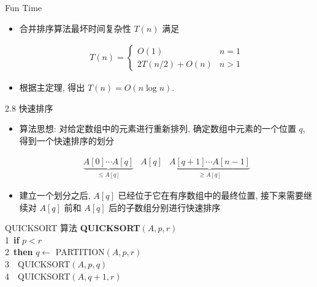 \documentclass[fontset=fandol,UTF8,fleqn]{beamer}
\begin{document}
\begin{frame}{Fun Time}
\begin{itemize}[<+-|alert@+>]
\item 合并排序算法最坏时间复杂性 $T(n)$ 满足 
  \begin{exampleblock}{}
    \begin{eqnarray*}
  T(n) = \left\{
    \begin{array}{ll}
      O(1) & n = 1   \\
2T(n/2)+O(n) & n > 1   
    \end{array}\right. 
\end{eqnarray*}
\end{exampleblock}
\item 根据主定理, 得出 $T(n)=O(n\log n)$.  
\end{itemize}
\end{frame}

\begin{frame}{2.8 快速排序}
\begin{itemize}[<+-|alert@+>]
\item 算法思想: 对给定数组中的元素进行重新排列, 确定数组中元素的一个位置 $q$, 得到一个快速排序的划分
  \begin{exampleblock}{}
\begin{eqnarray*}
\underbrace{A[0]\cdots A[q]}_{ \leq A[q]} & A[q] & \underbrace{A[q+1]\cdots A[n-1]}_{\geq A[q]}  
\end{eqnarray*}
\end{exampleblock}
\item 建立一个划分之后, $A[q]$ 已经位于它在有序数组中的最终位置, 接下来需要继续对 $A[q]$ 前和 $A[q]$ 后的子数组分别进行快速排序 
\end{itemize}
\end{frame}

\begin{frame}{\textsf{QUICKSORT} 算法}
\textbf{QUICKSORT}$(A,p,r)$\\
1\qquad\   \textbf{if} $p < r$\\
2\qquad\ \textbf{then} $q\gets$  \textsf{PARTITION}$(A,p,r)$\\
3\qquad\ \qquad\ \textsf{QUICKSORT}$(A,p,q)$\\
4\qquad\ \qquad\  \textsf{QUICKSORT}$(A,q + 1,r)$
\end{frame}
\end{document}
